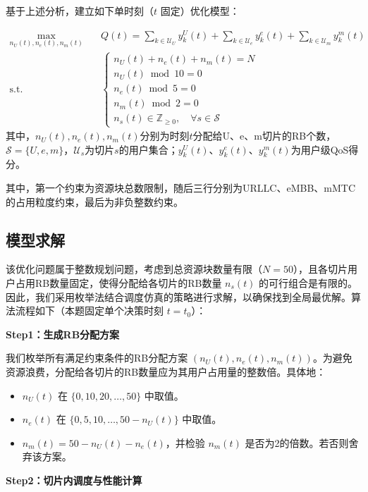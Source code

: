 基于上述分析，建立如下单时刻（$t$ 固定）优化模型：

\begin{equation}
\begin{aligned}
\max_{n_U(t), n_e(t), n_m(t)} \quad & Q(t) = \sum_{k \in \mathcal{U}_U} y_k^{U}(t) + \sum_{k \in \mathcal{U}_e} y_k^{e}(t) + \sum_{k \in \mathcal{U}_m} y_k^{m}(t) \\
\text{s.t.} \quad & \begin{cases}
 n_U(t) + n_e(t) + n_m(t) = N \\
 n_U(t) \bmod 10 = 0 \\
 n_e(t) \bmod 5 = 0 \\
 n_m(t) \bmod 2 = 0 \\
 n_s(t) \in \mathbb{Z}_{\ge 0}, \quad \forall s \in \mathcal{S}
 \end{cases}
 \end{aligned}
 \end{equation}
其中，$n_U(t), n_e(t), n_m(t)$分别为时刻$t$分配给U、e、m切片的RB个数，$\mathcal{S}=\{U,e,m\}$，$\mathcal{U}_s$为切片$s$的用户集合；$y_k^{U}(t)$、$y_k^{e}(t)$、$y_k^{m}(t)$为用户级QoS得分。

其中，第一个约束为资源块总数限制，随后三行分别为URLLC、eMBB、mMTC的占用粒度约束，最后为非负整数约束。
\subsection{模型求解}

该优化问题属于整数规划问题，考虑到总资源块数量有限（$N=50$），且各切片用户占用RB数量固定，使得分配给各切片的RB数量 $n_s(t)$ 的可行组合是有限的。因此，我们采用枚举法结合调度仿真的策略进行求解，以确保找到全局最优解。算法流程如下（本题固定单个决策时刻 $t=t_0$）：

\textbf{Step1：生成RB分配方案}

我们枚举所有满足约束条件的RB分配方案 $(n_U(t), n_e(t), n_m(t))$。为避免资源浪费，分配给各切片的RB数量应为其用户占用量的整数倍。具体地：
\begin{itemize}
    \item $n_U(t)$ 在 $\{0, 10, 20, \dots, 50\}$ 中取值。
    \item $n_e(t)$ 在 $\{0, 5, 10, \dots, 50 - n_U(t)\}$ 中取值。
    \item $n_m(t) = 50 - n_U(t) - n_e(t)$，并检验 $n_m(t)$ 是否为2的倍数。若否则舍弃该方案。
\end{itemize}

\textbf{Step2：切片内调度与性能计算}

